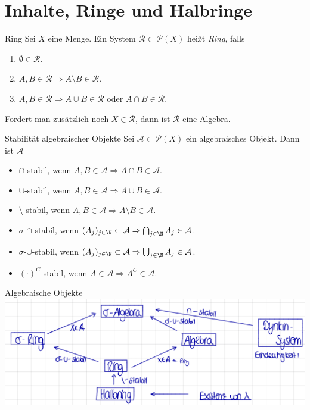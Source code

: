 \section*{Inhalte, Ringe und Halbringe}

\begin{karte}{Ring}
	Sei \(X\) eine Menge. Ein System \(\mathcal{R} \subset \mathcal{P}(X) \) heißt \textit{Ring}, falls 
	\begin{enumerate}
		\item \( \emptyset \in \mathcal{R} \).
		\item \( A,B \in \mathcal{R} \Rightarrow A\setminus B \in \mathcal{R} \).
		\item \( A,B \in \mathcal{R} \Rightarrow A \cup B \in \mathcal{R} \) oder \( A\cap B \in \mathcal{R} \).
	\end{enumerate}
	Fordert man zusätzlich noch \(X \in \mathcal{R}\), dann ist \(\mathcal{R}\) eine Algebra.
\end{karte}

\begin{karte}{Stabilität algebraischer Objekte}
	Sei \( \mathcal{A} \subset \mathcal{P}(X) \) ein algebraisches Objekt. 
	Dann ist \( \mathcal{A} \)
	\begin{itemize}
		\item \(\cap\)-stabil, wenn \( A,B\in \mathcal{A} \Rightarrow A \cap B \in \mathcal{A} \).
		\item \(\cup\)-stabil, wenn \( A,B\in \mathcal{A} \Rightarrow A \cup B \in \mathcal{A} \).
		\item \(\setminus\)-stabil, wenn \( A,B\in \mathcal{A} \Rightarrow A \setminus B \in \mathcal{A} \).
		\item \(\sigma\)-\(\cap\)-stabil, wenn \( (A_j)_{j\in\N} \subset \mathcal{A} \Rightarrow \bigcap_{j\in\N} A_j \in \mathcal{A} \).
		\item \(\sigma\)-\(\cup\)-stabil, wenn \( (A_j)_{j\in\N} \subset \mathcal{A} \Rightarrow \bigcup_{j\in\N} A_j \in \mathcal{A} \).
		\item \( (\cdot)^C\)-stabil, wenn \( A \in \mathcal{A} \Rightarrow A^C \in \mathcal{A} \).
	\end{itemize}
\end{karte}

\begin{karte}{Algebraische Objekte}
	\centering
	\includegraphics[height=0.33\textwidth]{algebraische-objekte-zusammenhang.png}
\end{karte}

